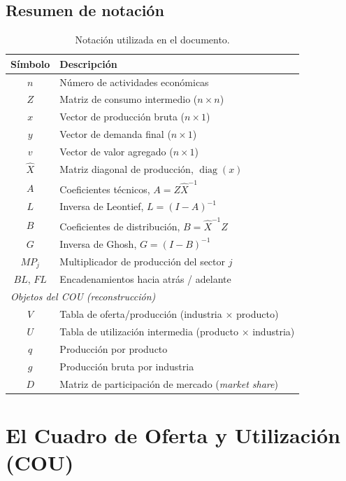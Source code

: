 \documentclass[11pt,a4paper]{article}
\newcommand{\diag}{\operatorname{diag}}
\begin{document}
\subsection{Resumen de notación}
\begin{table}[h]
\centering
\small
\begin{tabular}{cl}
\toprule
\textbf{Símbolo} & \textbf{Descripción}\\
\midrule
$n$        & Número de actividades económicas\\
$Z$        & Matriz de consumo intermedio ($n\times n$)\\
$x$        & Vector de producción bruta ($n\times 1$)\\
$y$        & Vector de demanda final ($n\times 1$)\\
$v$        & Vector de valor agregado ($n\times 1$)\\
$\hat{X}$  & Matriz diagonal de producción, $\diag(x)$\\
$A$        & Coeficientes técnicos, $A=Z\hat{X}^{-1}$\\
$L$        & Inversa de Leontief, $L=(I-A)^{-1}$\\
$B$        & Coeficientes de distribución, $B=\hat{X}^{-1}Z$\\
$G$        & Inversa de Ghosh, $G=(I-B)^{-1}$\\
$MP_j$     & Multiplicador de producción del sector $j$\\
$BL,\,FL$  & Encadenamientos hacia atrás / adelante\\
\midrule
\multicolumn{2}{l}{\emph{Objetos del COU (reconstrucción)}}\\
$V$        & Tabla de oferta/producción (industria $\times$ producto)\\
$U$        & Tabla de utilización intermedia (producto $\times$ industria)\\
$q$        & Producción por producto\\
$g$        & Producción bruta por industria\\
$D$        & Matriz de participación de mercado (\emph{market share})\\
\bottomrule
\end{tabular}
\caption{Notación utilizada en el documento.}
\end{table}

\section{El Cuadro de Oferta y Utilización (COU)}
\end{document}
